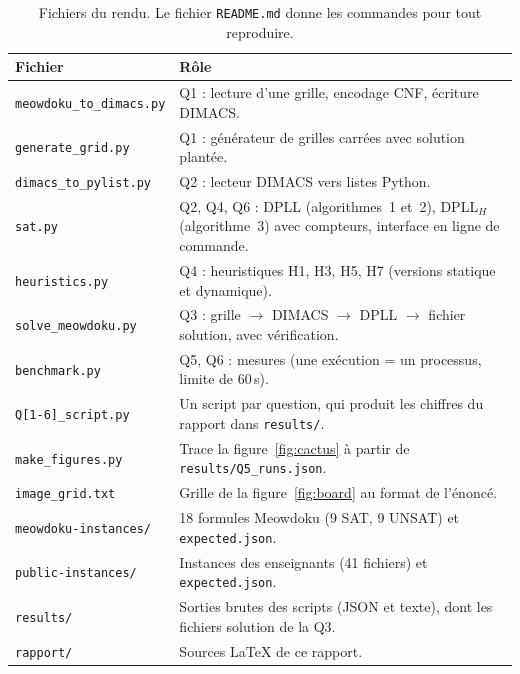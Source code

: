 \documentclass[11pt,a4paper]{article}
\begin{document}
\begin{table}[H]
\centering\small
\begin{tabular}{@{}p{4.3cm}p{11.3cm}@{}}
\toprule
Fichier & Rôle\\
\midrule
\texttt{meowdoku\_to\_dimacs.py} & Q1 : lecture d'une grille, encodage CNF, écriture DIMACS.\\
\texttt{generate\_grid.py} & Q1 : générateur de grilles carrées avec solution plantée.\\
\texttt{dimacs\_to\_pylist.py} & Q2 : lecteur DIMACS vers listes Python.\\
\texttt{sat.py} & Q2, Q4, Q6 : DPLL (algorithmes~1 et~2), DPLL$_H$ (algorithme~3) avec compteurs, interface en ligne de commande.\\
\texttt{heuristics.py} & Q4 : heuristiques H1, H3, H5, H7 (versions statique et dynamique).\\
\texttt{solve\_meowdoku.py} & Q3 : grille $\to$ DIMACS $\to$ DPLL $\to$ fichier solution, avec vérification.\\
\texttt{benchmark.py} & Q5, Q6 : mesures (une exécution = un processus, limite de 60\,s).\\
\texttt{Q[1-6]\_script.py} & Un script par question, qui produit les chiffres du rapport dans \texttt{results/}.\\
\texttt{make\_figures.py} & Trace la figure~\ref{fig:cactus} à partir de \texttt{results/Q5\_runs.json}.\\
\texttt{image\_grid.txt} & Grille de la figure~\ref{fig:board} au format de l'énoncé.\\
\texttt{meowdoku-instances/} & 18 formules Meowdoku (9 SAT, 9 UNSAT) et \texttt{expected.json}.\\
\texttt{public-instances/} & Instances des enseignants (41 fichiers) et \texttt{expected.json}.\\
\texttt{results/} & Sorties brutes des scripts (JSON et texte), dont les fichiers solution de la Q3.\\
\texttt{rapport/} & Sources \LaTeX{} de ce rapport.\\
\bottomrule
\end{tabular}
\caption{Fichiers du rendu. Le fichier \texttt{README.md} donne les commandes pour tout reproduire.}
\label{tab:files}
\end{table}
\end{document}
